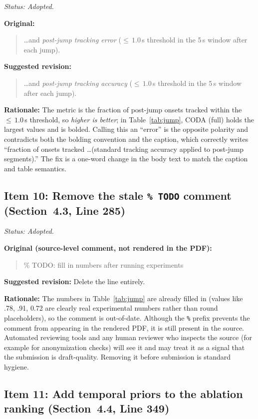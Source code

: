 \documentclass{article}
\begin{document}
\textit{Status: Adopted.}

\textbf{Original:}
\begin{quote}
\ldots and \emph{post-jump tracking error} (${\leq}\,1.0$\,s threshold in the 5\,s window after each jump).
\end{quote}

\textbf{Suggested revision:}
\begin{quote}
\ldots and \emph{post-jump tracking accuracy} (${\leq}\,1.0$\,s threshold in the 5\,s window after each jump).
\end{quote}

\textbf{Rationale:}
The metric is the fraction of post-jump onsets tracked within the ${\leq}\,1.0$\,s threshold, so \emph{higher is better}; in Table~\ref{tab:jump}, CODA (full) holds the largest values and is bolded. Calling this an ``error'' is the opposite polarity and contradicts both the bolding convention and the caption, which correctly writes ``fraction of onsets tracked \ldots (standard tracking accuracy applied to post-jump segments).'' The fix is a one-word change in the body text to match the caption and table semantics.

\subsection*{Item 10: Remove the stale \texttt{\% TODO} comment (Section~4.3, Line 285)}

\textit{Status: Adopted.}

\textbf{Original (source-level comment, not rendered in the PDF):}
\begin{quote}\small\ttfamily
\% TODO: fill in numbers after running experiments
\end{quote}

\textbf{Suggested revision:}
Delete the line entirely.

\textbf{Rationale:}
The numbers in Table~\ref{tab:jump} are already filled in (values like .78, .91, 0.72 are clearly real experimental numbers rather than round placeholders), so the comment is out-of-date. Although the \texttt{\%} prefix prevents the comment from appearing in the rendered PDF, it is still present in the source. Automated reviewing tools and any human reviewer who inspects the source (for example for anonymization checks) will see it and may treat it as a signal that the submission is draft-quality. Removing it before submission is standard hygiene.

\subsection*{Item 11: Add temporal priors to the ablation ranking (Section~4.4, Line 349)}
\end{document}
